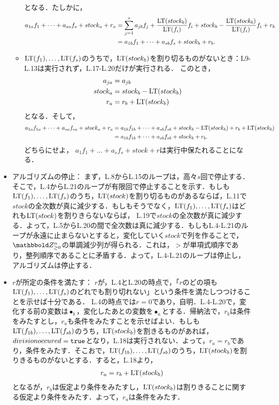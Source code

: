 \documentclass[9pt]{ltjsarticle}
\begin{document}
\begin{myproof}
\begin{itemize}
\begin{itemize}
となる．たしかに，
\begin{align}
 a_{1a}f_1 + \dots + a_{sa}f_s + stock_a + r_a
&=
\sum_{j=1}^s a_{jb}  f_j + \frac{{\rm LT}(stock_b)}{{\rm LT}(f_i)}f_i + stock_b - \frac{{\rm LT}(stock_b)}{{\rm LT}(f_i)}f_i + r_b\\
 & =
a_{1b}f_1 + \dots + a_{sb}f_s + stock_b + r_b.
\end{align}
 \item ${\rm LT}(f_1),\dots,{\rm LT}(f_s)$のうちで，${\rm LT}(stock_b)$を割り切るものがないとき：L9-L.13は実行されず，L.17-L.20だけが実行される．
このとき，
\begin{align}
 a_{ja} &= a_{jb}\\
 stock_a & = stock_b - {\rm LT}(stock_b)\\
 r_a & = r_b + {\rm LT}(stock_b)
\end{align}
となる．そして，
\begin{align}
 a_{1a} f_{1a} + \dots + a_{sa} f_{sa} + stock_a + r_a
&=
a_{1b} f_{1b} + \dots + a_{sb} f_{sb} + stock_b - {\rm LT}(stock_b) + r_b + {\rm LT}(stock_b)\\
 & =
a_{1b}f_{1b} + \dots + a_{sb} f_{sb} + stock_b + r_b.
\end{align}
どちらにせよ，
$a_1 f_1 + \dots + a_s f_s + stock + r$は実行中保たれることになる．
\end{itemize}
  \item アルゴリズムの停止：
まず，L.8からL.15のループは，高々$s$回で停止する．そこで，L.4からL.21のループが有限回で停止することを示す．もしも${\rm LT}(f_1),\dots,{\rm LT}(f_s)$のうち，${\rm LT}(stock)$を割り切るものがあるならば，L.11で$stock$の全次数が真に減少する．もしもそうでなく，${\rm LT}(f_1),\dots,{\rm LT}(f_s)$はどれも${\rm LT}(stock)$を割りきらないならば，
L.19で$stock$の全次数が真に減少する．よって，L.5からL.20の間で全次数は真に減少する．もしもL.4-L.21のループが永遠に止まらないとすると，変化していく$stock$で列を作ることで，$\Zge^n$の単調減少列が得られる．これは，$>$が単項式順序であり，整列順序であることに矛盾する．よって，L.4-L.21のループは停止し，アルゴリズムは停止する．
  \item $r$が所定の条件を満たす：
$r$が，L.4とL.20の時点で，「$r$のどの項も${\rm LT}(f_1),\dots,{\rm LT}(f_s)$のどれでも割り切れない」という条件を満たしつつけることを示せば十分である．
L.4の時点では$r=0$であり，自明．L.4-L.20で，変化する前の変数は$\bullet_b$，変化したあとの変数を$\bullet_a$とする．帰納法で，$r_b$は条件をみたすとし，$r_a$も条件をみたすことを示せばよい．もしも${\rm LT}(f_{1b}),\dots,{\rm LT}(f_{sb})$のうち，${\rm LT}(stock_b)$を割きるものがあれば，$divisionoccured = {\tt true}$となり，L.18は実行されない．よって，$r_a = r_b$であり，条件をみたす．そこおで，${\rm LT}(f_{1b}),\dots,{\rm LT}(f_{sb})$のうち，${\rm LT}(stock_b)$を割りきるものがないとする．すると，L.18より，
\begin{align}
 r_a = r_b + {\rm LT}(stock_b)
\end{align}
となるが，$r_b$は仮定より条件をみたすし，${\rm LT}(stock_b)$は割りきることに関する仮定より条件をみたす．よって，$r_a$は条件をみたす．


\end{itemize}
\end{myproof}
\end{document}
